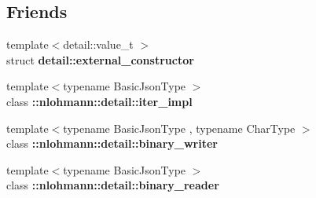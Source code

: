 \subsection*{Friends}
\begin{DoxyCompactItemize}
\item 
\mbox{\label{classnlohmann_1_1basic__json_a6275ed57bae6866cdf5db5370a7ad47c}} 
{\footnotesize template$<$detail\+::value\+\_\+t $>$ }\\struct {\bfseries detail\+::external\+\_\+constructor}
\item 
\mbox{\label{classnlohmann_1_1basic__json_a842e5c7ca096025c18b11e715d3401f4}} 
{\footnotesize template$<$typename Basic\+Json\+Type $>$ }\\class {\bfseries \+::nlohmann\+::detail\+::iter\+\_\+impl}
\item 
\mbox{\label{classnlohmann_1_1basic__json_a69d491bbda88ade6d3c7a2b11309e8bf}} 
{\footnotesize template$<$typename Basic\+Json\+Type , typename Char\+Type $>$ }\\class {\bfseries \+::nlohmann\+::detail\+::binary\+\_\+writer}
\item 
\mbox{\label{classnlohmann_1_1basic__json_af0bb1c07bf0d88f8b86a235c92893a39}} 
{\footnotesize template$<$typename Basic\+Json\+Type $>$ }\\class {\bfseries \+::nlohmann\+::detail\+::binary\+\_\+reader}
\end{DoxyCompactItemize}
